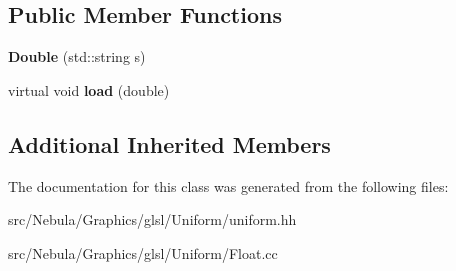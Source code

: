\subsection*{Public Member Functions}
\begin{DoxyCompactItemize}
\item 
\hypertarget{classNeb_1_1glsl_1_1Uniform_1_1Scalar_1_1Double_a69bb07fb2fa171a1067bf7558b91ec57}{{\bfseries Double} (std\-::string s)}\label{classNeb_1_1glsl_1_1Uniform_1_1Scalar_1_1Double_a69bb07fb2fa171a1067bf7558b91ec57}

\item 
\hypertarget{classNeb_1_1glsl_1_1Uniform_1_1Scalar_1_1Double_aa3e09a61118c65d3af510b3f7b8080ec}{virtual void {\bfseries load} (double)}\label{classNeb_1_1glsl_1_1Uniform_1_1Scalar_1_1Double_aa3e09a61118c65d3af510b3f7b8080ec}

\end{DoxyCompactItemize}
\subsection*{Additional Inherited Members}


The documentation for this class was generated from the following files\-:\begin{DoxyCompactItemize}
\item 
src/\-Nebula/\-Graphics/glsl/\-Uniform/uniform.\-hh\item 
src/\-Nebula/\-Graphics/glsl/\-Uniform/Float.\-cc\end{DoxyCompactItemize}
